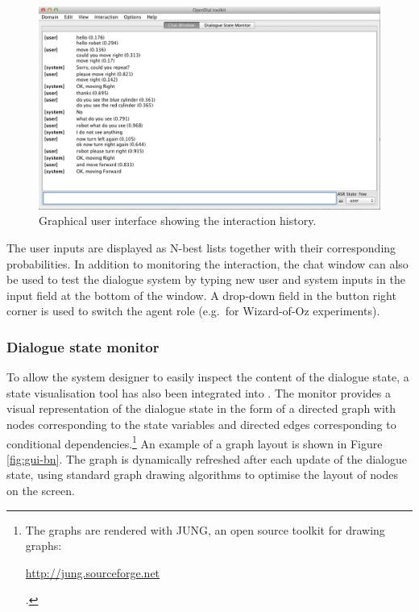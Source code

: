 \begin{figure}[ht]
\centering
\includegraphics[scale=0.40]{imgs/gui-chatbox.png}
\caption{Graphical user interface showing the interaction history.}
\label{fig:gui-chatbox}
\end{figure}

  The user inputs are displayed as N-best lists together with their corresponding probabilities. In addition to monitoring the interaction, the chat window can also be used to test the dialogue system by typing new user and system inputs in the input field at the bottom of the window.  A drop-down field in the button right corner is used to switch the agent role (e.g.\ for Wizard-of-Oz experiments). 


\subsubsection*{Dialogue state monitor}

To allow the system designer to easily inspect the content of the dialogue state, a state visualisation tool has also been integrated into \opendial{}.  The monitor provides a visual representation of the dialogue state in the form of a directed graph with nodes corresponding to the state variables and directed edges corresponding to conditional dependencies.\footnote{The graphs are rendered with JUNG, an open source toolkit for drawing graphs: \begin{scriptsize}\url{http://jung.sourceforge.net}\end{scriptsize}.} An example of a graph layout is shown in Figure \ref{fig:gui-bn}. The graph is dynamically refreshed after each update of the dialogue state, using standard graph drawing algorithms to optimise the layout of nodes on the screen. 

